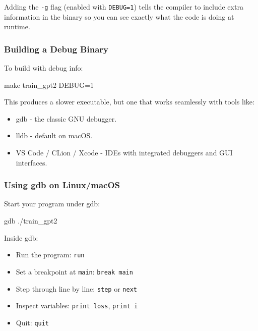\documentclass[
  letterpaper,
  DIV=11,
  numbers=noendperiod]{scrreprt}
\newenvironment{Shaded}{\begin{snugshade}}{\end{snugshade}}
\newcommand{\FunctionTok}[1]{\textcolor[rgb]{0.28,0.35,0.67}{#1}}
\newcommand{\NormalTok}[1]{\textcolor[rgb]{0.00,0.23,0.31}{#1}}
\providecommand{\tightlist}{%
  \setlength{\itemsep}{0pt}\setlength{\parskip}{0pt}}
\begin{document}
Adding the \texttt{-g} flag (enabled with \texttt{DEBUG=1}) tells the
compiler to include extra information in the binary so you can see
exactly what the code is doing at runtime.

\subsubsection{Building a Debug Binary}\label{building-a-debug-binary}

To build with debug info:

\begin{Shaded}
\begin{Highlighting}[]
\FunctionTok{make}\NormalTok{ train\_gpt2 DEBUG=1}
\end{Highlighting}
\end{Shaded}

This produces a slower executable, but one that works seamlessly with
tools like:

\begin{itemize}
\tightlist
\item
  gdb - the classic GNU debugger.
\item
  lldb - default on macOS.
\item
  VS Code / CLion / Xcode - IDEs with integrated debuggers and GUI
  interfaces.
\end{itemize}

\subsubsection{Using gdb on Linux/macOS}\label{using-gdb-on-linuxmacos}

Start your program under gdb:

\begin{Shaded}
\begin{Highlighting}[]
\FunctionTok{gdb}\NormalTok{ ./train\_gpt2}
\end{Highlighting}
\end{Shaded}

Inside gdb:

\begin{itemize}
\tightlist
\item
  Run the program: \texttt{run}
\item
  Set a breakpoint at \texttt{main}: \texttt{break\ main}
\item
  Step through line by line: \texttt{step} or \texttt{next}
\item
  Inspect variables: \texttt{print\ loss}, \texttt{print\ i}
\item
  Quit: \texttt{quit}
\end{itemize}
\end{document}
